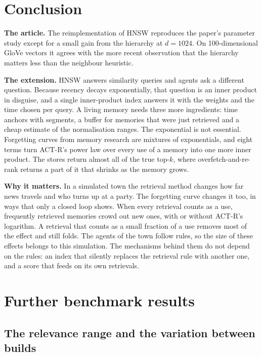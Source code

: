 \documentclass[11pt,a4paper]{article}
\begin{document}
\section{Conclusion}

\textbf{The article.} The reimplementation of HNSW reproduces the paper's parameter study except for a small gain from the hierarchy at $d=1024$. On 100-dimensional GloVe vectors it agrees with the more recent observation that the hierarchy matters less than the neighbour heuristic.

\textbf{The extension.} HNSW answers similarity queries and agents ask a different question. Because recency decays exponentially, that question is an inner product in disguise, and a single inner-product index answers it with the weights and the time chosen per query. A living memory needs three more ingredients: time anchors with segments, a buffer for memories that were just retrieved and a cheap estimate of the normalisation ranges. The exponential is not essential. Forgetting curves from memory research are mixtures of exponentials, and eight terms turn ACT-R's power law over every use of a memory into one more inner product. The stores return almost all of the true top-$k$, where overfetch-and-re-rank returns a part of it that shrinks as the memory grows.

\textbf{Why it matters.} In a simulated town the retrieval method changes how far news travels and who turns up at a party. The forgetting curve changes it too, in ways that only a closed loop shows. When every retrieval counts as a use, frequently retrieved memories crowd out new ones, with or without ACT-R's logarithm. A retrieval that counts as a small fraction of a use removes most of the effect and still folds. The agents of the town follow rules, so the size of these effects belongs to this simulation. The mechanisms behind them do not depend on the rules: an index that silently replaces the retrieval rule with another one, and a score that feeds on its own retrievals.

\clearpage
\appendix
\section{Further benchmark results}
\label{sec:appbench}

\subsection{The relevance range and the variation between builds}
\end{document}
